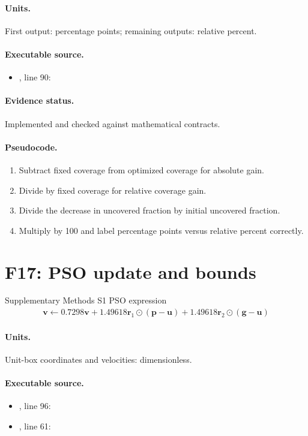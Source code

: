 \documentclass[10pt]{article}
\begin{document}
\paragraph{Units.} First output: percentage points; remaining outputs: relative percent.
\paragraph{Executable source.}
\begin{itemize}[leftmargin=*]
\item {}, line 90: 
\end{itemize}
\paragraph{Evidence status.} Implemented and checked against mathematical contracts.
\paragraph{Pseudocode.}
\begin{enumerate}[leftmargin=*]
\item Subtract fixed coverage from optimized coverage for absolute gain.
\item Divide by fixed coverage for relative coverage gain.
\item Divide the decrease in uncovered fraction by initial uncovered fraction.
\item Multiply by 100 and label percentage points versus relative percent correctly.
\end{enumerate}
\newpage
\section*{F17: PSO update and bounds}
Supplementary Methods S1 PSO expression
\begin{gather*}\mathbf v\leftarrow0.7298\mathbf v+1.49618\mathbf r_1\odot(\mathbf p-\mathbf u)+1.49618\mathbf r_2\odot(\mathbf g-\mathbf u)\end{gather*}
\paragraph{Units.} Unit-box coordinates and velocities: dimensionless.
\paragraph{Executable source.}
\begin{itemize}[leftmargin=*]
\item {}, line 96: 
\item {}, line 61: 
\end{itemize}
\end{document}
